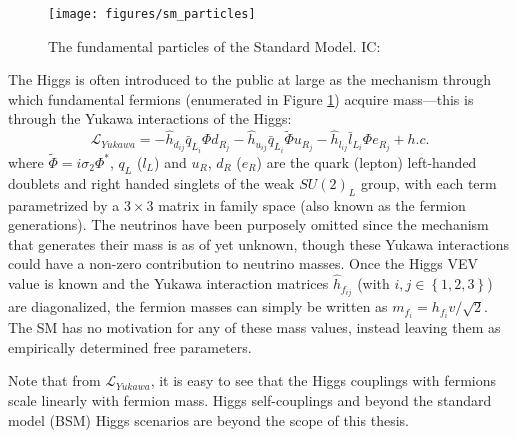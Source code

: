 \begin{figure}[!htbp]\captionsetup{justification=centering}
  \centering
  \texttt{[image: figures/sm\_particles]}
  \caption{The fundamental particles of the Standard Model.  IC: \cite{smcartoon}}
  \label{fig:smparticles}
\end{figure}
The Higgs is often introduced to the public at large as the mechanism through which fundamental fermions (enumerated in Figure \ref{fig:smparticles}) acquire mass---this is through the Yukawa interactions of the Higgs:
\begin{equation}
\mathcal{L}_{Yukawa}=-\hat{h}_{d_{ij}}\bar{q}_{L_i}\Phi d_{R_j} - \hat{h}_{u_{ij}}\bar{q}_{L_i}\tilde{\Phi} u_{R_j} -\hat{h}_{l_{ij}}\bar{l}_{L_i}\Phi e_{R_j} + h.c.
\end{equation}
where $\tilde{\Phi}=i\sigma_2\Phi^*$, $q_L$ ($l_L$) and $u_R$, $d_R$ ($e_R$) are the quark (lepton) left-handed doublets and right handed singlets of the weak $SU\left(2\right)_L$ group, with each term parametrized by a $3\times3$ matrix in family space (also known as the fermion generations).  The neutrinos have been purposely omitted since the mechanism that generates their mass is as of yet unknown, though these Yukawa interactions could have a non-zero contribution to neutrino masses.  Once the Higgs VEV value is known and the Yukawa interaction matrices $\hat{h}_{f_{ij}}$ (with $i,j\in\left\{1,2,3\right\}$) are diagonalized, the fermion masses can simply be written as $m_{f_i}=h_{f_i}v/\sqrt{2}$.  The SM has no motivation for any of these mass values, instead leaving them as empirically determined free parameters.

Note that from $\mathcal{L}_{Yukawa}$, it is easy to see that the Higgs couplings with fermions scale linearly with fermion mass.  Higgs self-couplings and beyond the standard model (BSM) Higgs scenarios are beyond the scope of this thesis.

